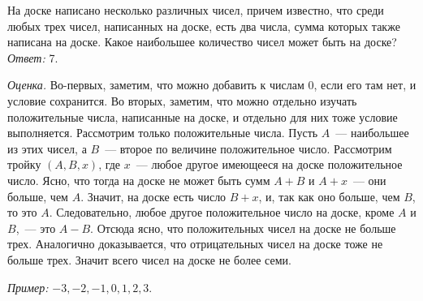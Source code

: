 \problem{}
На доске написано несколько различных чисел, причем известно, что среди любых
трех чисел, написанных на доске, есть два числа, сумма которых также написана
на доске.
Какое наибольшее количество чисел может быть на доске?
\solution
\emph{Ответ:} 7.
\par
\emph{Оценка.}
Во-первых, заметим, что можно добавить к числам 0, если его там нет,
и условие сохранится.
Во вторых, заметим, что можно отдельно изучать положительные числа,
написанные на доске, и отдельно для них тоже условие выполняется.
Рассмотрим только положительные числа.
Пусть $A$~--- наибольшее из этих чисел, а $B$~--- второе по величине
положительное число.
Рассмотрим тройку $(A, B, x)$, где $x$~--- любое другое имеющееся на доске
положительное число.
Ясно, что тогда на доске не может быть сумм $A + B$ и $A + x$~--- они больше,
чем $A$.
Значит, на доске есть число $B + x$, и, так как оно больше, чем $B$, то это
$A$.
Следовательно, любое другое положительное число на доске, кроме $A$ и $B$,~---
это $A - B$.
Отсюда ясно, что положительных чисел на доске не больше трех.
Аналогично доказывается, что отрицательных чисел на доске тоже не больше трех.
Значит всего чисел на доске не более семи.
\par
\emph{Пример:} $-3, -2, -1, 0, 1, 2, 3$.
\endproblem
